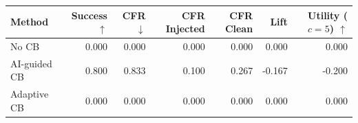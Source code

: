 \begin{tabular}{lrrrrrr}
\toprule
Method & Success $\uparrow$ & CFR $\downarrow$ & CFR Injected & CFR Clean & Lift & Utility ($c=5$) $\uparrow$ \\
\midrule
No CB & 0.000 & 0.000 & 0.000 & 0.000 & 0.000 & 0.000 \\
AI-guided CB & 0.800 & 0.833 & 0.100 & 0.267 & -0.167 & -0.200 \\
Adaptive CB & 0.000 & 0.000 & 0.000 & 0.000 & 0.000 & 0.000 \\
\bottomrule
\end{tabular}
